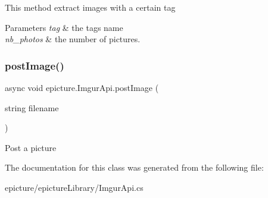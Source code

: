 This method extract images with a certain tag 
\begin{DoxyParams}{Parameters}
{\em tag} & the tag\textquotesingle{}s name \\
\hline
{\em nb\+\_\+photos} & the number of pictures. \\
\hline
\end{DoxyParams}
\mbox{\label{classepicture_1_1_imgur_api_a9f5cec5e327a823db214ff4d4738197a}} 
\subsubsection{\texorpdfstring{post\+Image()}{postImage()}}
{\footnotesize\ttfamily async void epicture.\+Imgur\+Api.\+post\+Image (\begin{DoxyParamCaption}\item[{string}]{filename }\end{DoxyParamCaption})}

Post a picture 

The documentation for this class was generated from the following file\+:\begin{DoxyCompactItemize}
\item 
epicture/epicture\+Library/Imgur\+Api.\+cs\end{DoxyCompactItemize}
